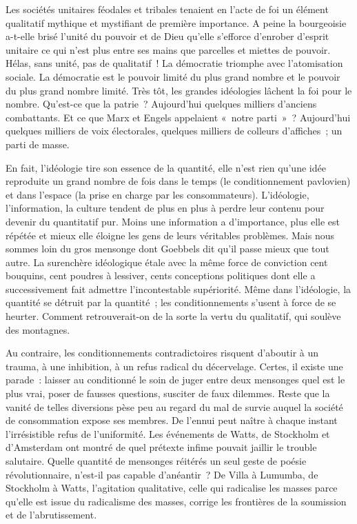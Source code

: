 \documentclass[french,twoside]{book} %
\begin{document}
Les sociétés unitaires féodales et tribales tenaient en l’acte de foi un élément qualitatif mythique et mystifiant de première importance. A peine la bourgeoisie a-t-elle brisé l’unité du pouvoir et de Dieu qu’elle s’efforce d’enrober d’esprit unitaire ce qui n’est plus entre ses mains que parcelles et miettes de pouvoir. Hélas, sans unité, pas de qualitatif ! La démocratie triomphe avec l’atomisation sociale. La démocratie est le pouvoir limité du plus grand nombre et le pouvoir du plus grand nombre limité. Très tôt, les grandes idéologies lâchent la foi pour le nombre. Qu’est-ce que la patrie ? Aujourd’hui quelques milliers d’anciens combattants. Et ce que Marx et Engels appelaient « notre parti » ? Aujourd’hui quelques milliers de voix électorales, quelques milliers de colleurs d’affiches ; un parti de masse.\par
En fait, l’idéologie tire son essence de la quantité, elle n’est rien qu’une idée reproduite un grand nombre de fois dans le temps (le conditionnement pavlovien) et dans l’espace (la prise en charge par les consommateurs). L’idéologie, l’information, la culture tendent de plus en plus à perdre leur contenu pour devenir du quantitatif pur. Moins une information a d’importance, plus elle est répétée et mieux elle éloigne les gens de leurs véritables problèmes. Mais nous sommes loin du gros mensonge dont Goebbels dit qu’il passe mieux que tout autre. La surenchère idéologique étale avec la même force de conviction cent bouquins, cent poudres à lessiver, cents conceptions politiques dont elle a successivement fait admettre l’incontestable supériorité. Même dans l’idéologie, la quantité se détruit par la quantité ; les conditionnements s’usent à force de se heurter. Comment retrouverait-on de la sorte la vertu du qualitatif, qui soulève des montagnes.\par
Au contraire, les conditionnements contradictoires risquent d’aboutir à un trauma, à une inhibition, à un refus radical du décervelage. Certes, il existe une parade : laisser au conditionné le soin de juger entre deux mensonges quel est le plus vrai, poser de fausses questions, susciter de faux dilemmes. Reste que la vanité de telles diversions pèse peu au regard du mal de survie auquel la société de consommation expose ses membres. De l’ennui peut naître à chaque instant l’irrésistible refus de l’uniformité. Les événements de Watts, de Stockholm et d’Amsterdam ont montré de quel prétexte infime pouvait jaillir le trouble salutaire. Quelle quantité de mensonges réitérés un seul geste de poésie révolutionnaire, n’est-il pas capable d’anéantir ? De Villa à Lumumba, de Stockholm à Watts, l’agitation qualitative, celle qui radicalise les masses parce qu’elle est issue du radicalisme des masses, corrige les frontières de la soumission et de l’abrutissement.
\end{document}
